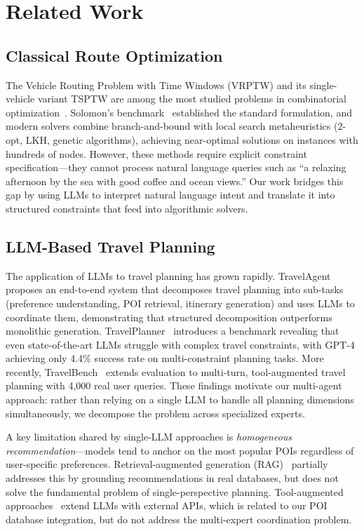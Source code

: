 \section{Related Work}
\label{sec:related_work}

\subsection{Classical Route Optimization}

The Vehicle Routing Problem with Time Windows (VRPTW) and its single-vehicle variant TSPTW are among the most studied problems in combinatorial optimization~\cite{toth2014vehicle}. Solomon's benchmark~\cite{solomon1987algorithms} established the standard formulation, and modern solvers combine branch-and-bound with local search metaheuristics (2-opt, LKH, genetic algorithms), achieving near-optimal solutions on instances with hundreds of nodes. However, these methods require explicit constraint specification---they cannot process natural language queries such as ``a relaxing afternoon by the sea with good coffee and ocean views.'' Our work bridges this gap by using LLMs to interpret natural language intent and translate it into structured constraints that feed into algorithmic solvers.

\subsection{LLM-Based Travel Planning}

The application of LLMs to travel planning has grown rapidly. TravelAgent~\cite{chen2024travelagent} proposes an end-to-end system that decomposes travel planning into sub-tasks (preference understanding, POI retrieval, itinerary generation) and uses LLMs to coordinate them, demonstrating that structured decomposition outperforms monolithic generation. TravelPlanner~\cite{han2024travelplanner} introduces a benchmark revealing that even state-of-the-art LLMs struggle with complex travel constraints, with GPT-4 achieving only 4.4\% success rate on multi-constraint planning tasks. More recently, TravelBench~\cite{travelbench2025} extends evaluation to multi-turn, tool-augmented travel planning with 4,000 real user queries. These findings motivate our multi-agent approach: rather than relying on a single LLM to handle all planning dimensions simultaneously, we decompose the problem across specialized experts.

A key limitation shared by single-LLM approaches is \textit{homogeneous recommendation}---models tend to anchor on the most popular POIs regardless of user-specific preferences. Retrieval-augmented generation (RAG)~\cite{lewis2020retrieval,gao2024retrieval} partially addresses this by grounding recommendations in real databases, but does not solve the fundamental problem of single-perspective planning. Tool-augmented approaches~\cite{qin2023toolllm} extend LLMs with external APIs, which is related to our POI database integration, but do not address the multi-expert coordination problem.

